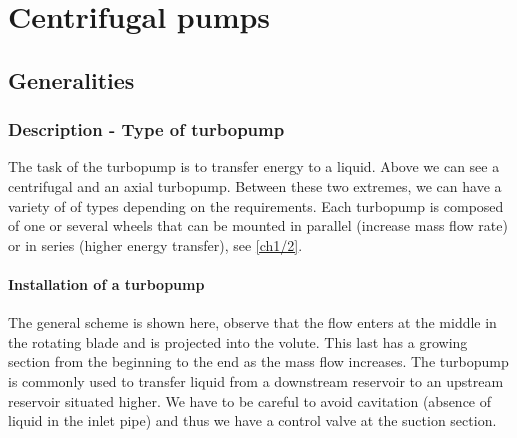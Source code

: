 
\chapter{Centrifugal pumps}
\section{Generalities}
\subsection{Description - Type of turbopump}
The task of the turbopump is to transfer energy to a liquid. Above we can see a centrifugal and an axial turbopump. Between these two extremes, we can have a variety of of types depending on the requirements. Each turbopump is composed of one or several wheels that can be mounted in parallel (increase mass flow rate) or in series (higher energy transfer), see \autoref{ch1/2}. 

\subsubsection{Installation of a turbopump}
The general scheme is shown here, observe that the flow enters at the middle in the rotating blade and is projected into the volute. This last has a growing section from the beginning to the end as the mass flow increases. The turbopump is commonly used to transfer liquid from a downstream reservoir to an upstream reservoir situated higher. We have to be careful to avoid cavitation (absence of liquid in the inlet pipe) and thus we have a control valve at the suction section. 